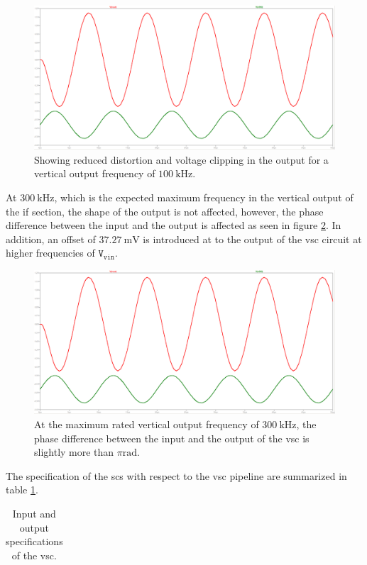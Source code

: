 \documentclass[class=report,11pt,crop=false]{standalone}
\begin{document}
	\begin{figure}[h!]
		\centering
		\includegraphics[width=0.7\linewidth]{Figures/Methodology/sig-cond-vsc-sine-sim-output-100khz}
		\caption{Showing reduced distortion and voltage clipping in the output for a vertical output frequency of $\SI{100}{\kilo\hertz}$.}
		\label{fig:sig-cond-vsc-sine-sim-output-100khz}
	\end{figure}  

	At $\SI{300}{\kilo\hertz}$, which is the expected maximum frequency in the vertical output of the \acrshort{if} section, the shape of the output is not affected, however, the phase difference between the input and the output is affected as seen in figure \ref{fig:sig-cond-vsc-sine-sim-output-300khz}. In addition, an offset of $\SI{37.27}{\milli\volt}$ is introduced at to the output of the \acrshort{vsc} circuit at higher frequencies of $\texttt{V}_\texttt{vin}$. 
	
	\begin{figure}[h!]
		\centering
		\includegraphics[width=0.7\linewidth]{Figures/Methodology/sig-cond-vsc-sine-sim-output-100khz}
		\caption{At the maximum rated vertical output frequency of $\SI{300}{\kilo\hertz}$, the phase difference between the input and the output of the \acrshort{vsc} is slightly more than $\pi\si{\radian}$.}
		\label{fig:sig-cond-vsc-sine-sim-output-300khz}
	\end{figure}  

	The specification of the \acrshort{scs} with respect to the \acrshort{vsc} pipeline are summarized in table \ref{tab:sig-cond-vsc-specs}.
	
	\begin{table}[ht!]
		\centering
		\label{tab:sig-cond-vsc-specs}
		\caption{Input and output specifications of the \acrshort{vsc}.}
		\begin{tabular}{ccc}
			
		\end{tabular}
	\end{table}
	
\end{document}
